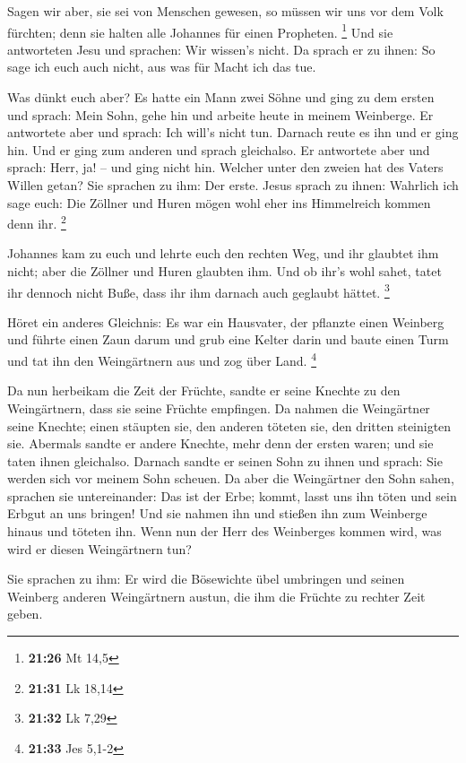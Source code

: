  Sagen wir aber, sie sei von Menschen gewesen, so müssen
wir uns vor dem Volk fürchten; denn sie halten alle Johannes für einen
Propheten. \footnote{\textbf{21:26} Mt 14,5}  Und sie
antworteten Jesu und sprachen: Wir wissen's nicht. Da sprach er zu
ihnen: So sage ich euch auch nicht, aus was für Macht ich das tue.

 Was dünkt euch aber? Es hatte ein Mann zwei Söhne und ging
zu dem ersten und sprach: Mein Sohn, gehe hin und arbeite heute in
meinem Weinberge.  Er antwortete aber und sprach: Ich
will's nicht tun. Darnach reute es ihn und er ging hin. 
Und er ging zum anderen und sprach gleichalso. Er antwortete aber und
sprach: Herr, ja! -- und ging nicht hin.  Welcher unter den
zweien hat des Vaters Willen getan? Sie sprachen zu ihm: Der erste.
Jesus sprach zu ihnen: Wahrlich ich sage euch: Die Zöllner und Huren
mögen wohl eher ins Himmelreich kommen denn ihr. \footnote{\textbf{21:31}
  Lk 18,14}

 Johannes kam zu euch und lehrte euch den rechten Weg, und
ihr glaubtet ihm nicht; aber die Zöllner und Huren glaubten ihm. Und ob
ihr's wohl sahet, tatet ihr dennoch nicht Buße, dass ihr ihm darnach
auch geglaubt hättet. \footnote{\textbf{21:32} Lk 7,29}

 Höret ein anderes Gleichnis: Es war ein Hausvater, der
pflanzte einen Weinberg und führte einen Zaun darum und grub eine Kelter
darin und baute einen Turm und tat ihn den Weingärtnern aus und zog über
Land. \footnote{\textbf{21:33} Jes 5,1-2}

 Da nun herbeikam die Zeit der Früchte, sandte er seine
Knechte zu den Weingärtnern, dass sie seine Früchte empfingen.
 Da nahmen die Weingärtner seine Knechte; einen stäupten
sie, den anderen töteten sie, den dritten steinigten sie. 
Abermals sandte er andere Knechte, mehr denn der ersten waren; und sie
taten ihnen gleichalso.  Darnach sandte er seinen Sohn zu
ihnen und sprach: Sie werden sich vor meinem Sohn scheuen. 
Da aber die Weingärtner den Sohn sahen, sprachen sie untereinander: Das
ist der Erbe; kommt, lasst uns ihn töten und sein Erbgut an uns bringen!
 Und sie nahmen ihn und stießen ihn zum Weinberge hinaus
und töteten ihn.  Wenn nun der Herr des Weinberges kommen
wird, was wird er diesen Weingärtnern tun?

 Sie sprachen zu ihm: Er wird die Bösewichte übel umbringen
und seinen Weinberg anderen Weingärtnern austun, die ihm die Früchte zu
rechter Zeit geben.


